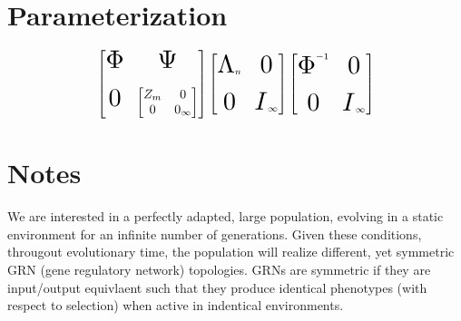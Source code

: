 \documentclass[a4paper, 11 pt]{article}
\newcommand\bigZero{\scalebox{2}{$0$}}
\newcommand\bigLambda{\scalebox{2}{$\Lambda$}}
\newcommand\bigI{\scalebox{2}{$I$}}
\newcommand\bigPhi{\scalebox{2}{$\Phi$}}
\newcommand\bigPsi{\scalebox{2}{$\Psi$}}
\begin{document}
   \section{Parameterization}

      \begin{equation}
        \begin{bmatrix} \bigPhi & \bigPsi \\ \\ \bigZero & \begin{bmatrix} Z_{m} & 0 \\ 0 & 0_{\infty} \end{bmatrix} \end{bmatrix} \begin{bmatrix} \bigLambda_{n} & \bigZero \\ \\ \bigZero & \bigI_{\infty} \end{bmatrix} \begin{bmatrix} \bigPhi^{-1} & \bigZero \\ \\ \bigZero & \bigI_{\infty} \end{bmatrix}
      \end{equation}

  \section{Notes}


    We are interested in a perfectly adapted, large population, evolving in a static environment for an infinite number of generations. Given these conditions, througout evolutionary time, the population will realize different, yet symmetric GRN (gene regulatory network) topologies. GRNs are symmetric if they are input/output equivlaent such that they produce identical phenotypes (with respect to selection) when active in indentical environments. 
\end{document}
